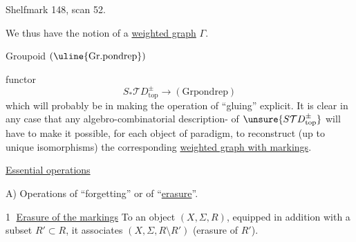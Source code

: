 Shelfmark 148, scan 52.


We thus have the notion of a \uline{weighted graph}   $\Gamma$.


Groupoid $(\uline{\mathrm{Gr.pondrep}})$

functor
\[
 S_*\mathcal TD_{\mathrm{top}}^\pm\longrightarrow(\mathrm{Grpondrep})
\]
which will probably be  in making the operation of ``gluing'' explicit.
It is clear in any case that any algebro-combinatorial description- of
$\unsure{S\mathcal TD_{\mathrm{top}}^\pm}$ will have to make it possible, for each object of
 paradigm, to reconstruct (up to unique isomorphisms) the corresponding \uline{weighted graph with markings}.

\uline{Essential operations}

A) Operations of ``forgetting'' or of ``\uline{erasure}''.

\textcircled{1} \uline{Erasure of the markings} To an object $(X,\Sigma,R)$, equipped in addition with a subset $R'\subset R$, it associates $(X,\Sigma,R\setminus R')$ (erasure of $R'$).
